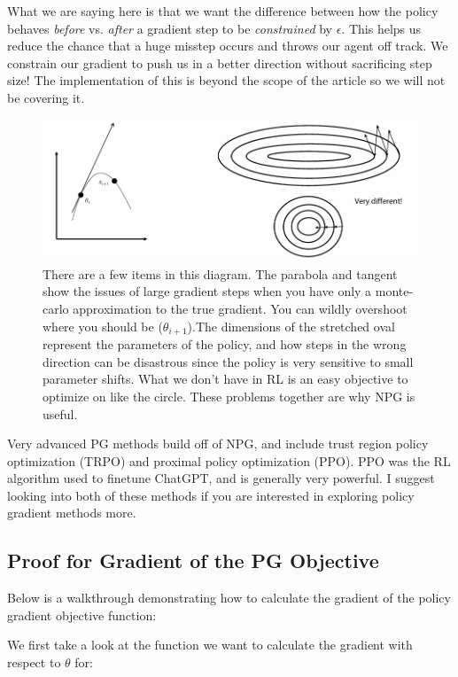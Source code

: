     What we are saying here is that we want the difference between how the policy behaves \textit{before} vs. \textit{after} a gradient step to be \textit{constrained} by $\epsilon$. This helps us reduce the chance that a huge misstep occurs and throws our agent off track. We constrain our gradient to push us in a better direction without sacrificing step size! The implementation of this is beyond the scope of the article so we will not be covering it. 

    \begin{figure}[H]
        \centering
        \includegraphics[width=0.9\linewidth]{rl/npg.png}
        \caption{There are a few items in this diagram. The parabola and tangent show the issues of large gradient steps when you have only a monte-carlo approximation to the true gradient. You can wildly overshoot where you should be ($\theta_{i+1}$).The dimensions of the stretched oval represent the parameters of the policy, and how steps in the wrong direction can be disastrous since the policy is very sensitive to small parameter shifts. What we don't have in RL is an easy objective to optimize on like the circle. These problems together are why NPG is useful.}
        \label{fig:npg}
    \end{figure}

    Very advanced PG methods build off of NPG, and include trust region policy optimization (TRPO) and proximal policy optimization (PPO). PPO was the RL algorithm used to finetune ChatGPT, and is generally very powerful. I suggest looking into both of these methods if you are interested in exploring policy gradient methods more.

\subsection{Proof for Gradient of the PG Objective}
    \large Below is a walkthrough demonstrating how to calculate the gradient of the policy gradient objective function: 

    We first take a look at the function we want to calculate the gradient with respect to $\theta$ for:

